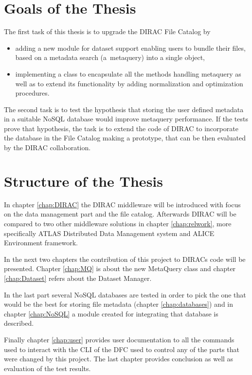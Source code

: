 \section*{Goals of the Thesis}

The first task of this thesis is to upgrade the DIRAC File Catalog by 
\begin{itemize}
\item adding a new module for dataset support enabling users to bundle their files, based on a metadata search 
(a~metaquery) into a single object,
\item implementing a class to encapsulate all the methods handling metaquery as well as to extend its 
functionality by adding normalization and optimization procedures.
\end{itemize}

The second task is to test the hypothesis that storing the user defined metadata in a suitable NoSQL database 
would improve metaquery performance. If the tests prove that hypothesis, the task is to extend the code of DIRAC 
to incorporate the database in the File Catalog making a prototype, that can be then evaluated by the DIRAC 
collaboration.

\section*{Structure of the Thesis}

In chapter \ref{chap:DIRAC} the DIRAC middleware will be introduced with focus on the data management part and the 
file catalog. Afterwards DIRAC will be compared to two other middleware solutions in chapter \ref{chap:relwork}, 
more specifically ATLAS Distributed Data Management system and ALICE Environment framework.

In the next two chapters the contribution of this project to DIRACs code will be presented. Chapter \ref{chap:MQ} 
is about the new MetaQuery class and chapter \ref{chap:Dataset} refers about the Dataset Manager.

In the last part several NoSQL databases are tested in order to pick the one that would be the best for storing
file metadata (chapter \ref{chap:databases}) and in chapter \ref{chap:NoSQL} a module created for integrating that 
database is described. 

Finally chapter \ref{chap:user} provides user documentation to all the commands used to interact with the CLI of 
the DFC used to control any of the parts that were changed by this project. The last chapter
provides conclusion as well as evaluation of the test results.